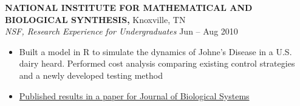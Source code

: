 \documentclass[geomargin]{res}
\begin{document}
\begin{resume}
{\bf NATIONAL INSTITUTE FOR MATHEMATICAL AND BIOLOGICAL SYNTHESIS,} Knoxville, TN \\
{\em NSF, Research Experience for Undergraduates}    \hfill
Jun -- Aug 2010 \\                                          \vspace{-4mm}
\begin{itemize}                                         \itemsep1pt 
        \item Built a model in R to simulate the dynamics of Johne's Disease in a U.S. dairy heard. Performed cost analysis comparing existing control strategies and a newly developed testing method
        \item \href{http://www.worldscientific.com/doi/abs/10.1142/S021833901340010X}{Published results in a paper for Journal of Biological Systems}
\end{itemize}
\vspace{-1mm}








\end{resume}
\end{document}
